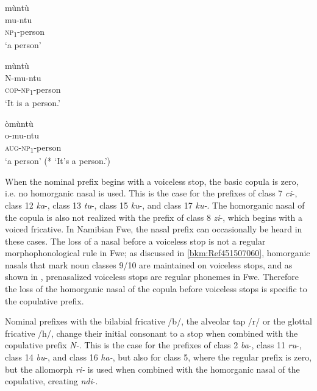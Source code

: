 \ea
\label{bkm:Ref450640706}
\glll mùntù\\
mu-ntu\\
\textsc{np}\textsubscript{1}-person\\
\glt ‘a person’
\z

\ea
\glll mùntù\\
N-mu-ntu\\
\textsc{cop}-\textsc{np}\textsubscript{1}-person\\
\glt ‘It is a person.’
\z

\ea
\label{bkm:Ref69997533}
\glll òmùntù\\
o-mu-ntu\\
\textsc{aug}-\textsc{np}\textsubscript{1}-person\\
\glt ‘a person’ (* ‘It’s a person.’)
\z

When the nominal prefix begins with a voiceless stop, the basic copula is zero, i.e. no homorganic nasal is used. This is the case for the prefixes of class 7 \textit{ci}\nobreakdash-, class 12 \textit{ka}\nobreakdash-, class 13 \textit{tu}\nobreakdash-, class 15 \textit{ku}\nobreakdash-, and class 17 \textit{ku-}. The homorganic nasal of the copula is also not realized with the prefix of class 8 \textit{zi}\nobreakdash-, which begins with a voiced fricative. In Namibian Fwe, the nasal prefix can occasionally be heard in these cases. The loss of a nasal before a voiceless stop is not a regular morphophonological rule in Fwe; as discussed in \ref{bkm:Ref451507060}, homorganic nasals that mark noun classes 9/10 are maintained on voiceless stops, and as shown in , prenasalized voiceless stops are regular phonemes in Fwe. Therefore the loss of the homorganic nasal of the copula before voiceless stops is specific to the copulative prefix.

Nominal prefixes with the bilabial fricative /b/, the alveolar tap /r/ or the glottal fricative /h/, change their initial consonant to a stop when combined with the copulative prefix \textit{N-}. This is the case for the prefixes of class 2 \textit{ba}\nobreakdash-, class 11 \textit{ru}\nobreakdash-, class 14 \textit{bu}\nobreakdash-, and class 16 \textit{ha-}, but also for class 5, where the regular prefix is zero, but the allomorph \textit{ri-} is used when combined with the homorganic nasal of the copulative, creating \textit{ndi}\nobreakdash-.

